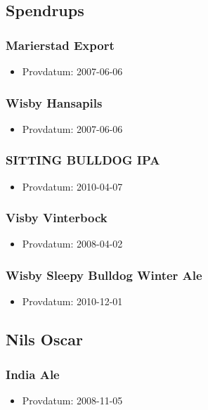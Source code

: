 \documentclass[11pt]{article}
\begin{document}
\subsection{Spendrups}
\label{sec:orge4b2fcb}
\subsubsection{Marierstad Export}
\label{sec:org3e32be4}
\begin{itemize}
\item Provdatum: 2007-06-06
\end{itemize}
\subsubsection{Wisby Hansapils}
\label{sec:org127ac5d}
\begin{itemize}
\item Provdatum: 2007-06-06
\end{itemize}
\subsubsection{SITTING BULLDOG IPA}
\label{sec:orgde71ac1}
\begin{itemize}
\item Provdatum: 2010-04-07
\end{itemize}
\subsubsection{Visby Vinterbock}
\label{sec:orga34b6b8}
\begin{itemize}
\item Provdatum: 2008-04-02
\end{itemize}
\subsubsection{Wisby Sleepy Bulldog Winter Ale}
\label{sec:org33b018f}
\begin{itemize}
\item Provdatum: 2010-12-01
\end{itemize}
\subsection{Nils Oscar}
\label{sec:orge819973}
\subsubsection{India Ale}
\label{sec:orgf5ba34f}
\begin{itemize}
\item Provdatum: 2008-11-05
\end{itemize}
\end{document}
